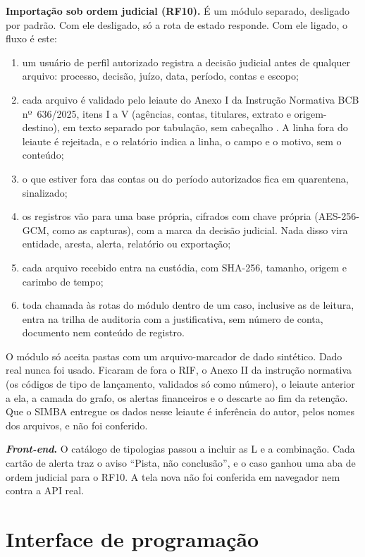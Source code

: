 \textbf{Importação sob ordem judicial (RF10).} É um módulo separado, desligado
por padrão. Com ele desligado, só a rota de estado responde. Com ele
ligado, o fluxo é este:
\begin{enumerate}
	\item um usuário de perfil autorizado registra a decisão judicial antes
	de qualquer arquivo: processo, decisão, juízo, data, período, contas e
	escopo;
	\item cada arquivo é validado pelo leiaute do Anexo I da Instrução
	Normativa BCB nº~636/2025, itens I a V (agências, contas, titulares,
	extrato e origem-destino), em texto separado por tabulação, sem
	cabeçalho \cite[arts.~2º e 3º]{bcb2025in636}. A linha fora do leiaute é
	rejeitada, e o relatório indica a linha, o campo e o motivo, sem o
	conteúdo;
	\item o que estiver fora das contas ou do período autorizados fica em
	quarentena, sinalizado;
	\item os registros vão para uma base própria, cifrados com chave própria
	(AES-256-GCM, como as capturas), com a marca da decisão judicial. Nada
	disso vira entidade, aresta, alerta, relatório ou exportação;
	\item cada arquivo recebido entra na custódia, com SHA-256, tamanho,
	origem e carimbo de tempo;
	\item toda chamada às rotas do módulo dentro de um caso, inclusive as de
	leitura, entra na
	trilha de auditoria com a justificativa, sem número de conta, documento
	nem conteúdo de registro.
\end{enumerate}
O módulo só aceita pastas com um arquivo-marcador de dado sintético. Dado
real nunca foi usado. Ficaram de fora o RIF, o Anexo II da instrução
normativa (os códigos de tipo de lançamento, validados só como número), o
leiaute anterior a ela, a camada do grafo, os alertas financeiros e o
descarte ao fim da retenção. Que o SIMBA entregue os dados nesse leiaute é
inferência do autor, pelos nomes dos arquivos, e não foi conferido.

\textbf{\textit{Front-end}.} O catálogo de tipologias passou a incluir as L
e a combinação. Cada cartão de alerta traz o aviso ``Pista, não
conclusão'', e o caso ganhou uma aba de ordem judicial para o RF10. A tela
nova não foi conferida em navegador nem contra a API real.

\section{Interface de programação}
\label{sec:desenv-api}

